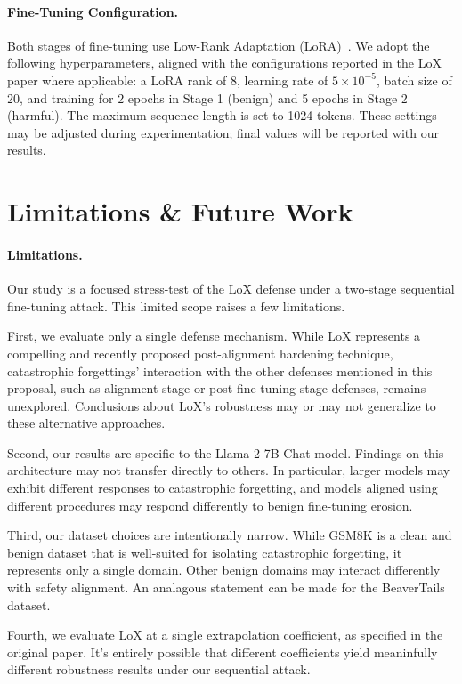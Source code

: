\documentclass[letterpaper,twocolumn,10pt]{article}
\begin{document}
\paragraph{Fine-Tuning Configuration.} Both stages of fine-tuning use Low-Rank Adaptation (LoRA)~\cite{hu2022lora}. We adopt the following hyperparameters, aligned with the configurations reported in the LoX paper where applicable: a LoRA rank of 8, learning rate of $5 \times 10^{-5}$, batch size of 20, and training for 2 epochs in Stage 1 (benign) and 5 epochs in Stage 2 (harmful). The maximum sequence length is set to 1024 tokens. These settings may be adjusted during experimentation; final values will be reported with our results.

\section{Limitations \& Future Work}
\label{sec:limitations}

\paragraph{Limitations.}
Our study is a focused stress-test of the LoX defense under a two-stage sequential fine-tuning attack. This limited scope raises a few limitations.

First, we evaluate only a single defense mechanism. While LoX represents a compelling and recently proposed post-alignment hardening technique, catastrophic forgettings' interaction with the other defenses mentioned in this proposal, such as alignment-stage or post-fine-tuning stage defenses, remains unexplored. Conclusions about LoX's robustness may or may not generalize to these alternative approaches.

Second, our results are specific to the Llama-2-7B-Chat model. Findings on this architecture may not transfer directly to others. In particular, larger models may exhibit different responses to catastrophic forgetting, and models aligned using different procedures may respond differently to benign fine-tuning erosion.

Third, our dataset choices are intentionally narrow. While GSM8K is a clean and benign dataset that is well-suited for isolating catastrophic forgetting, it represents only a single domain. Other benign domains may interact differently with safety alignment. An analagous statement can be made for the BeaverTails dataset.

Fourth, we evaluate LoX at a single extrapolation coefficient, as specified in the original paper. It's entirely possible that different coefficients yield meaninfully different robustness results under our sequential attack.
\end{document}
